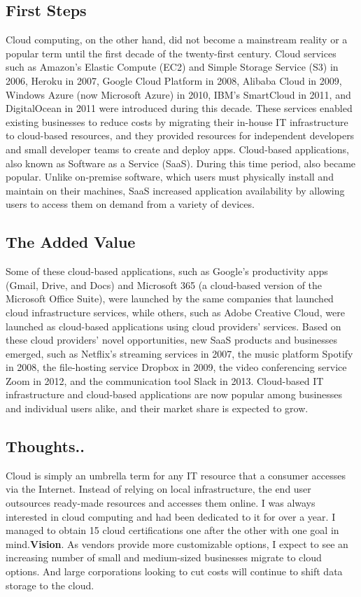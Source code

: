 \subsection{First Steps}
Cloud computing, on the other hand, did not become a mainstream reality or a popular term until the first decade of the twenty-first century. Cloud services such as Amazon's Elastic Compute (EC2) and Simple Storage Service (S3) in 2006, Heroku in 2007, Google Cloud Platform in 2008, Alibaba Cloud in 2009, Windows Azure (now Microsoft Azure) in 2010, IBM's SmartCloud in 2011, and DigitalOcean in 2011 were introduced during this decade. These services enabled existing businesses to reduce costs by migrating their in-house IT infrastructure to cloud-based resources, and they provided resources for independent developers and small developer teams to create and deploy apps. Cloud-based applications, also known as Software as a Service (SaaS). During this time period, also became popular. Unlike on-premise software, which users must physically install and maintain on their machines, SaaS increased application availability by allowing users to access them on demand from a variety of devices.

\subsection{The Added Value}
Some of these cloud-based applications, such as Google's productivity apps (Gmail, Drive, and Docs) and Microsoft 365 (a cloud-based version of the Microsoft Office Suite), were launched by the same companies that launched cloud infrastructure services, while others, such as Adobe Creative Cloud, were launched as cloud-based applications using cloud providers' services. Based on these cloud providers' novel opportunities, new SaaS products and businesses emerged, such as Netflix's streaming services in 2007, the music platform Spotify in 2008, the file-hosting service Dropbox in 2009, the video conferencing service Zoom in 2012, and the communication tool Slack in 2013. Cloud-based IT infrastructure and cloud-based applications are now popular among businesses and individual users alike, and their market share is expected to grow.


\subsection{Thoughts..}
Cloud is simply an umbrella term for any IT resource that a consumer accesses via the Internet. Instead of relying on local infrastructure, the end user outsources ready-made resources and accesses them online.
I was always interested in cloud computing and had been dedicated to it for over a year. I managed to obtain 15 cloud certifications one after the other with one goal in mind.\textbf{Vision}. \newline
As vendors provide more customizable options, I expect to see an increasing number of small and medium-sized businesses migrate to cloud options. And large corporations looking to cut costs will continue to shift data storage to the cloud.

